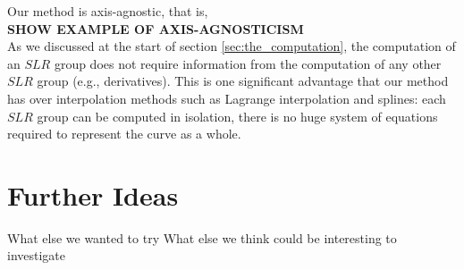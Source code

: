 \documentclass{article}
\begin{document}
Our method is axis-agnostic, that is, \\
\textbf{SHOW EXAMPLE OF AXIS-AGNOSTICISM}\\

As we discussed at the start of section \ref{sec:the_computation}, the computation of an $SLR$ group does not require information from the computation of any other $SLR$ group (e.g., derivatives). This is one significant advantage that our method has over interpolation methods such as Lagrange interpolation and splines: each $SLR$ group can be computed in isolation, there is no huge system of equations required to represent the curve as a whole.




\section{Further Ideas}
What else we wanted to try
What else we think could be interesting to investigate
\end{document}
